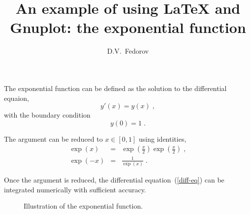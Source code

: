 \documentclass[twocolumn]{article}
\title{An example of using \LaTeX{} and Gnuplot: the exponential function}
\author{D.V.~Fedorov}
\begin{document}
\maketitle

\noindent
The exponential function can be defined as the solution to the
differential equaion,
\begin{equation}\label{diff-eq}
y'(x)=y(x) \;,
\end{equation}
with the boundary condition
\begin{equation}\label{bound-cond}
y(0)=1 \;.
\end{equation}

The argument can be reduced to $x\in[0,1]$ using identities,
\begin{eqnarray}
\exp(x)&=&\exp\left(\frac{x}{2}\right)\exp\left(\frac{x}{2}\right) \;, \\
\exp(-x)&=&\frac{1}{\exp(x)} \;.
\end{eqnarray}

Once the argument is reduced, the differential equation~(\ref{diff-eq})
can be integrated numerically with sufficient accuracy.

\begin{figure}[h]

\caption{Illustration of the exponential function.}
\end{figure}
\end{document}
